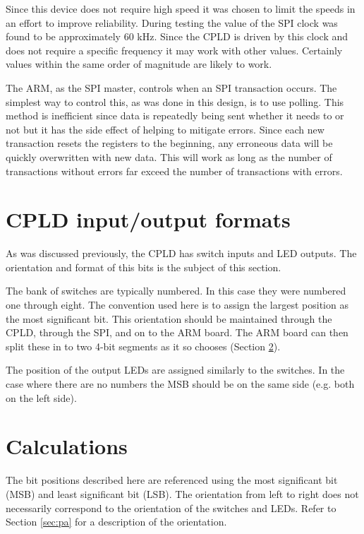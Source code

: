 \documentclass{article}
\begin{document}
Since this device does not require high speed it was
chosen to limit the speeds in an effort to improve reliability.
During testing the value of the SPI clock was found to be approximately
60 kHz.
Since the CPLD is driven by this clock and does not require a specific
frequency it may work with other values.
Certainly values within the same order of magnitude are likely to work.

The ARM, as the SPI master, controls when an SPI transaction occurs.
The simplest way to control this, as was done in this design, is to use polling.
This method is inefficient since data is repeatedly being sent
whether it needs to or not
but it has the side effect of helping to mitigate errors.
Since each new transaction resets the registers to the beginning,
any erroneous data will be quickly overwritten with new data.
This will work as long as the number of transactions without errors
far exceed the number of transactions with errors.


\section{CPLD input/output formats}
\label{sec:cpld}

As was discussed previously, the CPLD has switch inputs
and LED outputs.
The orientation and format of this bits is the subject of
this section.

The bank of switches are typically numbered.
In this case they were numbered one through eight.
The convention used here is to assign the largest
position as the most significant bit.
This orientation should be maintained through the CPLD,
through the SPI, and on to the ARM board.
The ARM board can then split these in to two 4-bit segments
as it so chooses (Section \ref{sec:calc}).

The position of the output LEDs are assigned similarly to
the switches.
In the case where there are no numbers the MSB should be
on the same side (e.g. both on the left side).


\section{Calculations}
\label{sec:calc}

The bit positions described here are referenced using the
most significant bit (MSB) and least significant bit (LSB).
The orientation from left to right does not necessarily
correspond to the orientation of the switches and LEDs.
Refer to Section \ref{sec:pa} for a description of the orientation.
\end{document}
